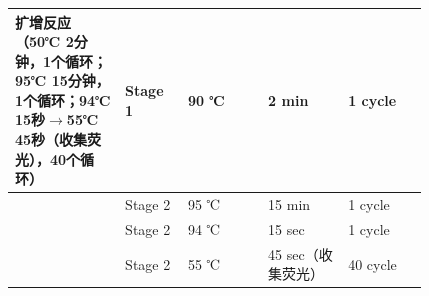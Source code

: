 \documentclass[UTF8,10pt,a4paper,fontset=fandol]{ctexart}
\newcommand{\fieldvalue}[1]{#1}
\newcommand{\handwritten}[1]{#1}
\begin{document}
\begin{tabular}{|p{0.22\linewidth}|p{0.12\linewidth}|p{0.16\linewidth}|p{0.16\linewidth}|p{0.16\linewidth}|}
\hline
扩增反应（50℃ 2分钟，1个循环；95℃ 15分钟，1个循环；94℃ 15秒$\rightarrow$55℃ 45秒（收集荧光），40个循环）
&
Stage 1
&
\fieldvalue{\handwritten{90}} ℃
&
\fieldvalue{\handwritten{2}} min
&
\fieldvalue{\handwritten{1}} cycle
\\ \hline
&
Stage 2
&
\fieldvalue{\handwritten{95}} ℃
&
\fieldvalue{\handwritten{15}} min
&
\fieldvalue{\handwritten{1}} cycle
\\ \hline
&
Stage 2
&
\fieldvalue{\handwritten{94}} ℃
&
\fieldvalue{\handwritten{15}} sec
&
\fieldvalue{\handwritten{1}} cycle
\\ \hline
&
Stage 2
&
\fieldvalue{\handwritten{55}} ℃
&
\fieldvalue{\handwritten{45}} sec（收集荧光）
&
\fieldvalue{\handwritten{40}} cycle
\\ \hline
\end{tabular}

\vspace{1mm}
\end{document}
